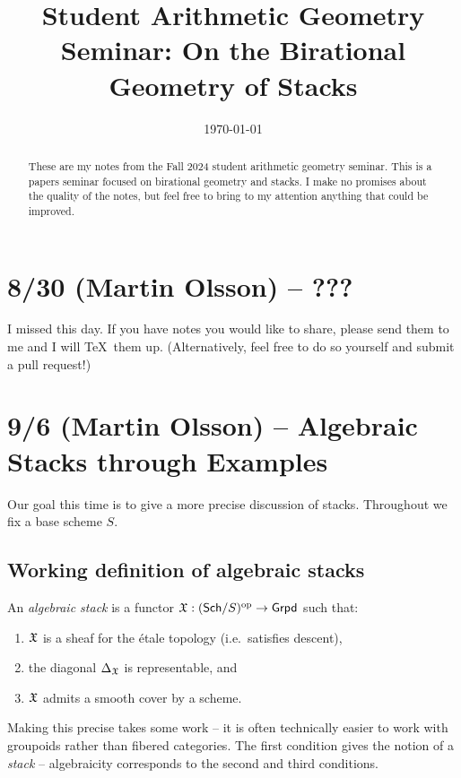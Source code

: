 \documentclass{amsart}
\title{Student Arithmetic Geometry Seminar: On the Birational Geometry of Stacks}
\date{\today}
\begin{document}
\begin{abstract}
	These are my notes from the Fall 2024 student arithmetic geometry seminar.
	This is a papers seminar focused on birational geometry and stacks.
	I make no promises about the quality of the notes, but feel free to bring to my attention anything that could be improved.
\end{abstract}

\maketitle

\section{8/30 (Martin Olsson) -- ???}

I missed this day.
If you have notes you would like to share, please send them to me and I will \TeX\, them up.
(Alternatively, feel free to do so yourself and submit a pull request!)

\section{9/6 (Martin Olsson) -- Algebraic Stacks through Examples}

Our goal this time is to give a more precise discussion of stacks.
Throughout we fix a base scheme $S$.

\subsection{Working definition of algebraic stacks}

\begin{dfn}
	An \emph{algebraic stack} is a functor $\mathfrak{X}: (\mathsf{Sch} / S)^{\mathrm{op}} \to \mathsf{Grpd}$ such that:
	\begin{enumerate}
		\item $\mathfrak{X}$ is a sheaf for the \'etale topology (i.e.\ satisfies descent),
		\item the diagonal $\Delta_{\mathfrak{X}}$ is representable, and 
		\item $\mathfrak{X}$ admits a smooth cover by a scheme.
	\end{enumerate}
\end{dfn}

Making this precise takes some work -- it is often technically easier to work with groupoids rather than fibered categories.
The first condition gives the notion of a \emph{stack} -- algebraicity corresponds to the second and third conditions.
\end{document}

